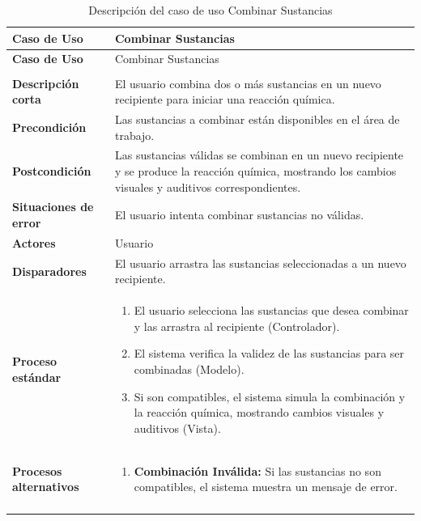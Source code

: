 \begin{longtable}{>{\raggedright\arraybackslash}m{} >{\raggedright\arraybackslash}m{}}
    \toprule\toprule
    \textbf{Caso de Uso} &   Combinar Sustancias \\
    \midrule\midrule
    \endfirsthead

    \toprule\toprule
    \textbf{Caso de Uso} &   Combinar Sustancias \\
    \midrule\midrule
    \endhead

    \midrule
    \multicolumn{2}{r}{\textit{Continúa en la siguiente página}} \\
    \midrule
    \endfoot

    \endlastfoot

    \textbf{Descripción corta} & El usuario combina dos o más sustancias en un nuevo recipiente para iniciar una reacción química.\\
    \midrule
    \textbf{Precondición} & Las sustancias a combinar están disponibles en el área de trabajo.\\
    \midrule
    \textbf{Postcondición} & Las sustancias válidas se combinan en un nuevo recipiente y se produce la reacción química, mostrando los cambios visuales y auditivos correspondientes.\\
    \midrule
    \textbf{Situaciones de error} & El usuario intenta combinar sustancias no válidas.\\
    \midrule
    \textbf{Actores} & Usuario \\
    \midrule
    \textbf{Disparadores} & El usuario arrastra las sustancias seleccionadas a un nuevo recipiente.\\
    \midrule
    \textbf{Proceso estándar} &
    \begin{enumerate}
        \item El usuario selecciona las sustancias que desea combinar y las arrastra al recipiente (Controlador). 
        \item El sistema verifica la validez de las sustancias para ser combinadas (Modelo). 
        \item Si son compatibles, el sistema simula la combinación y la reacción química, mostrando cambios visuales y auditivos (Vista).  
    \end{enumerate} \\
    \midrule
    \textbf{Procesos alternativos} & 
    \begin{enumerate}[{2}A. ]
        \item \textbf{Combinación Inválida:} Si las sustancias no son compatibles, el sistema muestra un mensaje de error.
    \end{enumerate}\\
    \midrule
    \caption{Descripción del caso de uso Combinar Sustancias}
    \label{tab:Caso_de_uso_ Balancear_Combinar_Sustancias}
\end{longtable}

